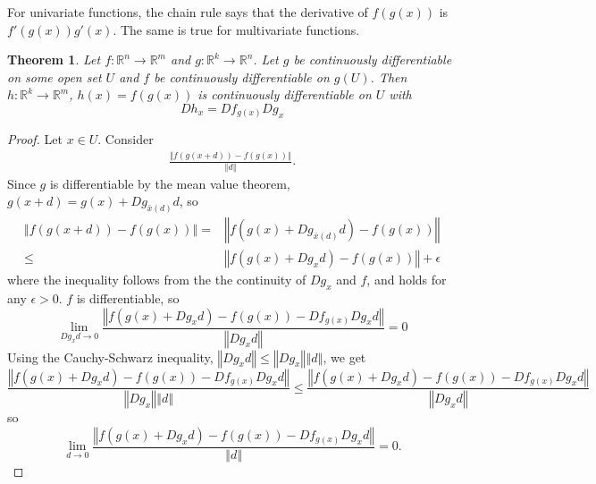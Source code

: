 \documentclass[12pt,reqno]{amsart}
\newtheorem{theorem}{Theorem}[section]
\theoremstyle{definition}
\def\R{\mathbb{R}}
\newcommand{\norm}[1]{\left\Vert {#1} \right\Vert}
\renewcommand{\to}{{\rightarrow}}
\begin{document}
For univariate functions, the chain rule says that the derivative of
$f(g(x))$ is $f'(g(x)) g'(x)$. The same is true for multivariate
functions.
\begin{theorem} \label{thm:chain}
  Let $f:\R^n \to \R^m$ and $g: \R^k \to \R^n$. Let $g$ be
  continuously differentiable on some open set $U$ and $f$ be
  continuously differentiable on $g(U)$. Then $h:\R^k \to \R^m$, $h
  (x) = f(g(x))$ 
  is continuously differentiable on $U$ with 
  \[ Dh_x = D f_{g(x)} D g_x \]
\end{theorem}
\begin{proof}
  Let $x \in U$. Consider
  \begin{align*}
    \frac{\norm{ f(g(x+d)) - f(g(x))}} {\norm{d}}.
  \end{align*}
  Since $g$ is differentiable by the mean value theorem, $g(x+d) =
  g(x) + Dg_{\bar{x}(d)} d$, so
  \begin{align*}
    \norm{ f(g(x+d)) - f(g(x))} = &  
    \norm{ f(g(x) + D g_{\bar{x}(d)} d ) - f(g(x))} \\
    \leq & \norm{f(g(x) + D g_x d) - f(g(x))} + \epsilon
  \end{align*}
  where the inequality follows from the the continuity of $D g_x$ and
  $f$, and holds for any $\epsilon >0$. $f$ is differentiable, so
  \[ \lim_{D g_x d \to 0} \frac{\norm{f(g(x) + D g_x d) -
      f(g(x)) - D f_{g(x)} D g_x d}} {\norm{D g_x d}} = 0 \]
  Using the Cauchy-Schwarz inequality, $\norm{D g_x d} \leq \norm{D
    g_x} \norm{d}$, we get
  \[ \frac{\norm{f(g(x) + D g_x d) -
      f(g(x)) - D f_{g(x)} D g_x d}} {\norm{D g_x} \norm{d}} \leq
  \frac{\norm{f(g(x) + D g_x d) -
      f(g(x)) - D f_{g(x)} D g_x d}} {\norm{D g_x d}} 
  \]
  so
  \[ \lim_{ d \to 0} \frac{\norm{f(g(x) + D g_x d) -
      f(g(x)) - D f_{g(x)} D g_x d}} {\norm{d}} = 0. \]   
\end{proof}
\end{document}
